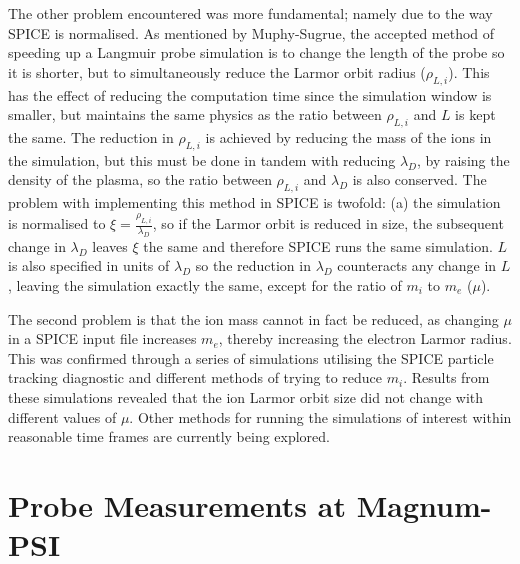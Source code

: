 \documentclass[a4paper, 11pt]{article} %
\begin{document}
	The other problem encountered was more fundamental; namely due to the way SPICE is normalised.
	As mentioned by Muphy-Sugrue\cite{Murphy-Sugrue2017a}, the accepted method of speeding up a Langmuir probe simulation is to change the length of the probe so it is shorter, but to simultaneously reduce the Larmor orbit radius ($\rho_{L,i}$).
	This has the effect of reducing the computation time since the simulation window is smaller, but maintains the same physics as the ratio between $\rho_{L,i}$ and $L$ is kept the same. 
	The reduction in $\rho_{L,i}$ is achieved by reducing the mass of the ions in the simulation, but this must be done in tandem with reducing $\lambda_D$, by raising the density of the plasma, so the ratio between $\rho_{L,i}$ and $\lambda_D$ is also conserved.
	The problem with implementing this method in SPICE is twofold: (a) the simulation is normalised to $\xi = \frac{\rho_{L,i}}{\lambda_D}$, so if the Larmor orbit is reduced in size, the subsequent change in $\lambda_D$ leaves $\xi$ the same and therefore SPICE runs the same simulation. 
	$L$ is also specified in units of $\lambda_D$ so the reduction in $\lambda_D$ counteracts any change in $L$, leaving the simulation exactly the same, except for the ratio of $m_i$ to $m_e$ ($\mu$).
	
	The second problem is that the ion mass cannot in fact be reduced, as changing $\mu$ in a SPICE input file increases $m_e$, thereby increasing the electron Larmor radius. 
	This was confirmed through a series of simulations utilising the SPICE particle tracking diagnostic and different methods of trying to reduce $m_i$. 
	Results from these simulations revealed that the ion Larmor orbit size did not change with different values of $\mu$.
	Other methods for running the simulations of interest within reasonable time frames are currently being explored.



\section{\label{sec:magnumprobes}Probe Measurements at Magnum-PSI}
\end{document}
